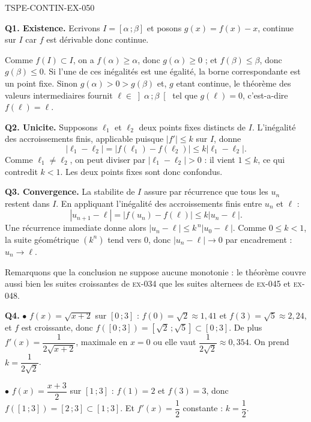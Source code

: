 \begin{corrige}{TSPE-CONTIN-EX-050}

\textbf{Q1. Existence.} Ecrivons $I = [\alpha\,;\beta]$ et posons $g(x) = f(x) - x$, continue sur $I$ car $f$ est dérivable donc continue.

Comme $f(I) \subset I$, on a $f(\alpha) \geq \alpha$, donc $g(\alpha) \geq 0$ ; et $f(\beta) \leq \beta$, donc $g(\beta) \leq 0$. Si l'une de ces inégalités est une égalité, la borne correspondante est un point fixe. Sinon $g(\alpha) > 0 > g(\beta)$ et, $g$ etant continue, le théorème des valeurs intermediaires fournit $\ell \in \left]\alpha\,;\beta\right[$ tel que $g(\ell) = 0$, c'est-a-dire $f(\ell) = \ell$.

\textbf{Q2. Unicite.} Supposons $\ell_1$ et $\ell_2$ deux points fixes distincts de $I$. L'inégalité des accroissements finis, applicable puisque $\left|f'\right| \leq k$ sur $I$, donne
\[ \left|\ell_1 - \ell_2\right| = \left|f(\ell_1) - f(\ell_2)\right| \leq k\left|\ell_1 - \ell_2\right|. \]
Comme $\ell_1
\neq \ell_2$, on peut diviser par $\left|\ell_1 - \ell_2\right| > 0$ : il vient $1 \leq k$, ce qui contredit $k < 1$. Les deux points fixes sont donc confondus.

\textbf{Q3. Convergence.} La stabilite de $I$ assure par récurrence que tous les $u_n$ restent dans $I$. En appliquant l'inégalité des accroissements finis entre $u_n$ et $\ell$ :
\[ \left|u_{n+1} - \ell\right| = \left|f(u_n) - f(\ell)\right| \leq k\left|u_n - \ell\right|. \]
Une récurrence immediate donne alors $\left|u_n - \ell\right| \leq k^{\,n}\left|u_0 - \ell\right|$. Comme $0 \leq k < 1$, la suite géométrique $\left(k^n\right)$ tend vers $0$, donc $\left|u_n - \ell\right| \to 0$ par encadrement : $u_n \to \ell$.

Remarquons que la conclusion ne suppose aucune monotonie : le théorème couvre aussi bien les suites croissantes de \textsc{ex-034} que les suites alternees de \textsc{ex-045} et \textsc{ex-048}.

\textbf{Q4.} $\bullet$ $f(x) = \sqrt{x+2}$ sur $[0\,;3]$ : $f(0) = \sqrt2 \approx 1{,}41$ et $f(3) = \sqrt5 \approx 2{,}24$, et $f$ est croissante, donc $f([0\,;3]) = \left[\sqrt2\,;\sqrt5\right] \subset [0\,;3]$. De plus $f'(x) = \dfrac{1}{2\sqrt{x+2}}$, maximale en $x = 0$ ou elle vaut $\dfrac{1}{2\sqrt2} \approx 0{,}354$. On prend $k = \dfrac{1}{2\sqrt2}$.

$\bullet$ $f(x) = \dfrac{x+3}{2}$ sur $[1\,;3]$ : $f(1) = 2$ et $f(3) = 3$, donc $f([1\,;3]) = [2\,;3] \subset [1\,;3]$. Et $f'(x) = \dfrac12$ constante : $k = \dfrac12$.


\end{corrige}

